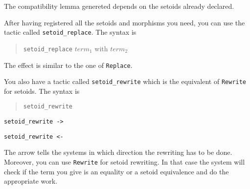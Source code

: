 \begin{ErrMsgs}
\item {}
\item {}
\item {}
\end{ErrMsgs}

The compatibility lemma genereted depends on the setoids already
declared.


After having registered all the setoids and morphisms you need, you can
use the tactic called \texttt{setoid\_replace}. The syntax is

\begin{quotation}
\texttt{setoid\_replace} $ term_1$ with $term_2$
\end{quotation}

The effect is similar to the one of \texttt{Replace}.

You also have a tactic called \texttt{setoid\_rewrite} which is the
equivalent of \texttt{Rewrite} for setoids. The syntax is 

\begin{quotation}
\texttt{setoid\_rewrite} \term
\end{quotation}

\begin{Variants}
 \item \texttt{setoid\_rewrite ->} \term
 \item \texttt{setoid\_rewrite <-} \term
\end{Variants}

The arrow tells the systems in which direction the rewriting has to be
done. Moreover, you can use \texttt{Rewrite} for setoid
rewriting. In that case the system will check if the term you give is
an equality or a setoid equivalence and do the appropriate work.

